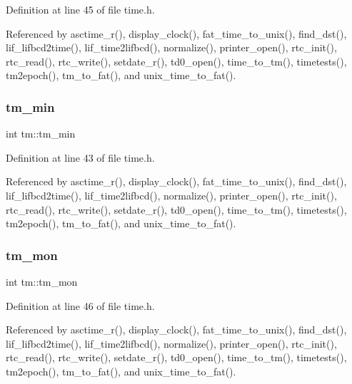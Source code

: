 Definition at line 45 of file time.\+h.



Referenced by asctime\+\_\+r(), display\+\_\+clock(), fat\+\_\+time\+\_\+to\+\_\+unix(), find\+\_\+dst(), lif\+\_\+lifbcd2time(), lif\+\_\+time2lifbcd(), normalize(), printer\+\_\+open(), rtc\+\_\+init(), rtc\+\_\+read(), rtc\+\_\+write(), setdate\+\_\+r(), td0\+\_\+open(), time\+\_\+to\+\_\+tm(), timetests(), tm2epoch(), tm\+\_\+to\+\_\+fat(), and unix\+\_\+time\+\_\+to\+\_\+fat().

\mbox{\label{structtm_af414eb7c86cc3099595211eee4d4211b}} 
\subsubsection{\texorpdfstring{tm\+\_\+min}{tm\_min}}
{\footnotesize\ttfamily int tm\+::tm\+\_\+min}



Definition at line 43 of file time.\+h.



Referenced by asctime\+\_\+r(), display\+\_\+clock(), fat\+\_\+time\+\_\+to\+\_\+unix(), find\+\_\+dst(), lif\+\_\+lifbcd2time(), lif\+\_\+time2lifbcd(), normalize(), printer\+\_\+open(), rtc\+\_\+init(), rtc\+\_\+read(), rtc\+\_\+write(), setdate\+\_\+r(), td0\+\_\+open(), time\+\_\+to\+\_\+tm(), timetests(), tm2epoch(), tm\+\_\+to\+\_\+fat(), and unix\+\_\+time\+\_\+to\+\_\+fat().

\mbox{\label{structtm_a112ac36fa2f593777138a417cf031e17}} 
\subsubsection{\texorpdfstring{tm\+\_\+mon}{tm\_mon}}
{\footnotesize\ttfamily int tm\+::tm\+\_\+mon}



Definition at line 46 of file time.\+h.



Referenced by asctime\+\_\+r(), display\+\_\+clock(), fat\+\_\+time\+\_\+to\+\_\+unix(), find\+\_\+dst(), lif\+\_\+lifbcd2time(), lif\+\_\+time2lifbcd(), normalize(), printer\+\_\+open(), rtc\+\_\+init(), rtc\+\_\+read(), rtc\+\_\+write(), setdate\+\_\+r(), td0\+\_\+open(), time\+\_\+to\+\_\+tm(), timetests(), tm2epoch(), tm\+\_\+to\+\_\+fat(), and unix\+\_\+time\+\_\+to\+\_\+fat().


